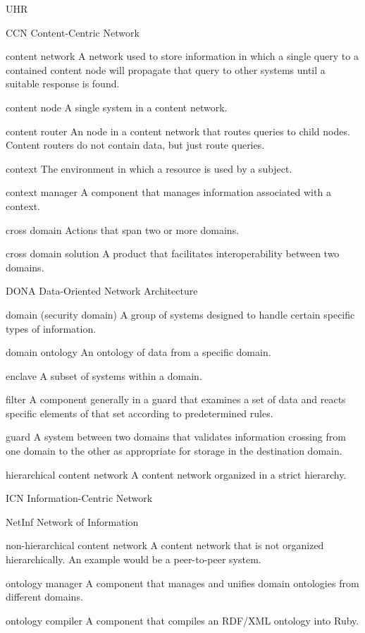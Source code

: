 \documentclass[botnum,fleqn,final]{unmeethesis}
\begin{document}
\begin{glossary}{UHR}
\item[CCN] Content-Centric Network
\item[content network] A network used to store information in which a single query to a contained content node will propagate that query to other systems until a suitable response is found.
\item[content node] A single system in a content network.
\item[content router] An node in a content network that routes queries to child nodes.  Content routers do not contain data, but just route queries.
\item[context] The environment in which a resource is used by a subject.
\item[context manager] A component that manages information associated with a context.
\item[cross domain] Actions that span two or more domains.
\item[cross domain solution] A product that facilitates interoperability between two domains.
\item[DONA] Data-Oriented Network Architecture
\item[domain (security domain)] A group of systems designed to handle certain specific types of information.
\item[domain ontology] An ontology of data from a specific domain.
\item[enclave] A subset of systems within a domain.
\item[filter] A component generally in a guard that examines a set of data and reacts specific elements of that set according to predetermined rules.
\item[guard] A system between two domains that validates information crossing from one domain to the other as appropriate for storage in the destination domain.
\item[hierarchical content network] A content network organized in a strict hierarchy.
\item[ICN] Information-Centric Network
\item[NetInf] Network of Information
\item[non-hierarchical content network] A content network that is not organized hierarchically.  An example would be a peer-to-peer system.
\item[ontology manager] A component that manages and unifies domain ontologies from different domains.
\item[ontology compiler] A component that compiles an RDF/XML ontology into Ruby.

\end{glossary}
\end{document}
